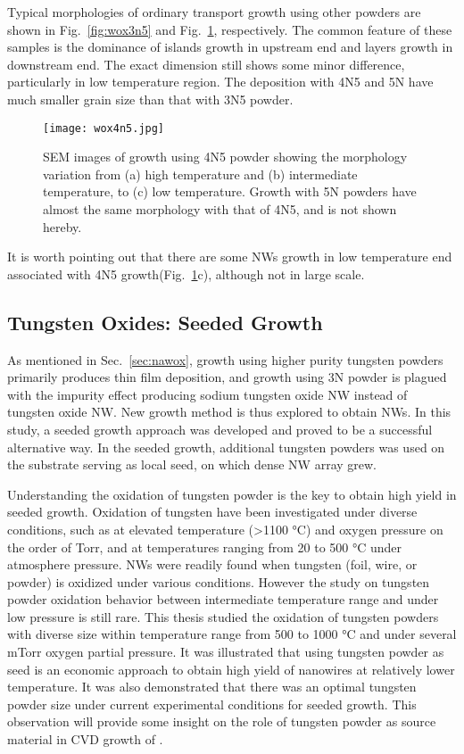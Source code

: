 Typical morphologies of ordinary transport growth using other powders are shown in Fig.~\ref{fig:wox3n5} and Fig.~\ref{fig:wox4n5}, respectively. The common feature of these samples is the dominance of islands growth in upstream end and layers growth in downstream end. The exact dimension still shows some minor difference, particularly in low temperature region. The deposition with 4N5 and 5N have much smaller grain size than that with 3N5 powder.
\begin{figure}[htb]
\centering
\texttt{[image: wox4n5.jpg]}
\caption[SEM images of  growth using 4N5 powder]{SEM images of  growth using 4N5 powder showing the morphology variation from (a) high temperature and (b) intermediate temperature, to (c) low temperature. Growth with 5N powders have almost the same morphology with that of 4N5, and is not shown hereby.}
\label{fig:wox4n5}
\end{figure}
It is worth pointing out that there are some NWs growth in low temperature end associated with 4N5 growth(Fig.~\ref{fig:wox4n5}c), although not in large scale.

\subsection{Tungsten Oxides: Seeded Growth }\label{sec:sgfg}

As mentioned in Sec.~\ref{sec:nawox}, growth using higher purity tungsten powders primarily produces thin film deposition, and growth using 3N powder is plagued with the impurity effect producing sodium tungsten oxide NW instead of tungsten oxide NW. New growth method is thus explored to obtain  NWs. In this study, a seeded growth approach was developed and proved to be a successful alternative way. In the seeded growth, additional tungsten powders was used on the substrate serving as local seed, on which dense  NW array grew. 

Understanding the oxidation of tungsten powder is the key to obtain high yield in seeded growth. Oxidation of tungsten have been investigated under diverse conditions, such as at elevated temperature (\textgreater 1100 \si{\degreeCelsius}) and oxygen pressure on the order of Torr,\cite{Base1965} and at temperatures ranging from 20 to 500 \si{\degreeCelsius} under atmosphere pressure.\cite{Warren1996}  NWs were readily found when tungsten (foil, wire, or powder) is oxidized under various conditions.\cite{Zhu1999,Karuppanan2007,Hsieh2010} However the study on tungsten powder oxidation behavior between intermediate temperature range and under low pressure is still rare. This thesis studied the oxidation of tungsten powders with diverse size within temperature range from 500 to 1000 \si{\degreeCelsius} and under several mTorr oxygen partial pressure. It was illustrated that using tungsten powder as seed is an economic approach to obtain high yield of  nanowires at relatively lower temperature. It was also demonstrated that there was an optimal tungsten powder size under current experimental conditions for seeded growth. This observation will provide some insight on the role of tungsten powder as source material in CVD growth of .

